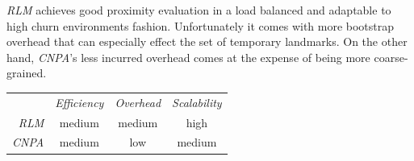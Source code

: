 \emph{RLM} achieves good proximity evaluation in a load balanced and adaptable to
high churn environments fashion. Unfortunately it comes with more bootstrap
overhead that can especially effect the set of temporary landmarks. On the other
hand, \emph{CNPA}'s less incurred overhead comes at the expense of being more
coarse-grained.



%
%
%

\begin{center}
{\footnotesize
\begin{tabular}{rccc}
\multicolumn{1}{r}{} &
\multicolumn{1}{c}{\emph{Efficiency}} &
\multicolumn{1}{c}{\emph{Overhead}} &
\multicolumn{1}{c}{\emph{Scalability}}
\\
\cline{2-4}
\emph{RLM} &
medium &
%
medium &
high \\
\emph{CNPA} &
%
medium &
low &
medium \\
\end{tabular}
}
\end{center}

